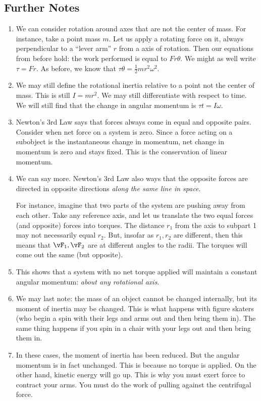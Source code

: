 \subsection{Further Notes}


\begin{enumerate}
  \item We can consider rotation around axes that are not the center of
  mass. For instance, take a point mass $m$. Let us apply a rotating
  force on it, always perpendicular to a ``lever arm'' $r$ from a axis
  of rotation. Then our equations from before hold: the work performed
  is equal to $Fr\theta$. We might as well write $\tau = Fr$. As before,
  we know that $\tau \theta = \frac{1}{2} mr^2 \omega^2$.

  \item We may still define the rotational inertia relative to a point
  not the center of mass. This is still $I = m r^2$. We may still
  differentiate with respect to time. We will still find that the change
  in angular momentum is $\tau t = I \omega$.

  \item Newton's 3rd Law says that forces always come in equal and
  opposite pairs. Consider when net force on a system is zero. Since a
  force acting on a subobject is the instantaneous change in momentum,
  net change in momentum is zero and stays fixed. This is the
  conservation of linear momentum.

  \item We can say more. Newton's 3rd Law also ways that the opposite
  forces are directed in opposite directions \emph{along the same line
  in space}.

  For instance, imagine that two parts of the system are pushing away
  from each other. Take any reference axis, and let us translate the two
  equal forces (and opposite) forces into torques. The distance $r_1$
  from the axis to subpart 1 may not necessarily equal $r_2$. But,
  insofar as $r_1, r_2$ are different, then this means that $\vF_1,
  \vF_2$ are at different angles to the radii. The torques will come out
  the same (but opposite).

  \item This shows that a system with no net torque applied will
  maintain a constant angular momentum: \emph{about any rotational
  axis}.

  \item We may last note: the mass of an object cannot be changed
  internally, but its moment of inertia may be changed. This is what
  happens with figure skaters (who begin a spin with their legs and arms
  out and then bring them in). The same thing happens if you spin in a
  chair with your legs out and then bring them in.

  \item In these cases, the moment of inertia has been reduced. But the
  angular momentum is in fact unchanged. This is because no torque is
  applied. On the other hand, kinetic energy will go up. This is why you
  must exert force to contract your arms. You must do the work of
  pulling against the centrifugal force.
\end{enumerate}
